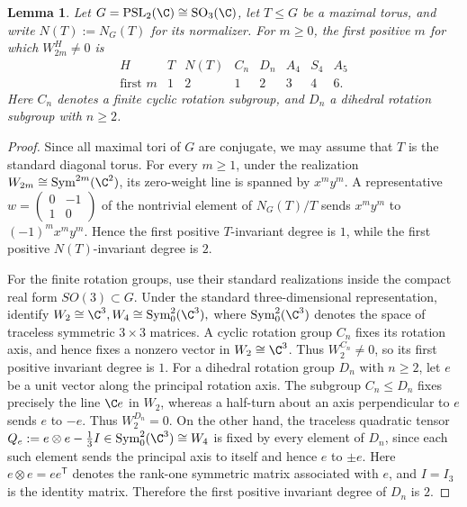 \documentclass[12pt,leqno]{amsart}
\numberwithin{equation}{section} \newtheorem{thm}{Theorem}[section] \newtheorem{lem}[thm]{Lemma} \newtheorem{ex}[thm]{Example} \newtheorem{prop}[thm]{Proposition} \newtheorem{cor}[thm]{Corollary} \newtheorem{defi}[thm]{Definition} \newtheorem{rmk}[thm]{Remark} \newtheorem{notation}[thm]{Notation}
\newcommand{\Sym}{\operatorname{Sym}}
\newcommand{\SO}{\operatorname{SO}}
\newcommand{\PSLtwo}{\operatorname{PSL}_2(\C)}
\begin{document}
\begin{lem}\label{lem:first-invariant-degrees}
Let $G=\PSLtwo\cong\SO_3(\C)$, let $T\le G$ be a maximal torus, and write \(N(T):=N_G(T)\) for its normalizer. For $m\ge0$, the first positive $m$ for which $W_{2m}^H\ne0$ is
\[
\begin{array}{c|ccccccc}
H&T&N(T)&C_n&D_n&A_4&S_4&A_5\\ \hline
\text{first }m&1&2&1&2&3&4&6.
\end{array}
\]
Here $C_n$ denotes a finite cyclic rotation subgroup, and $D_n$ a dihedral rotation subgroup with $n\ge2$.
\end{lem}

\begin{proof}
Since all maximal tori of $G$ are conjugate, we may assume that $T$ is the standard diagonal torus. For every $m\ge1$, under the realization $W_{2m}\cong\Sym^{2m}(\C^2)$, its zero-weight line is spanned by $x^my^m$. A representative $w=\begin{pmatrix}0&-1\\1&0\end{pmatrix}$ of the nontrivial element of $N_G(T)/T$ sends $x^my^m$ to $(-1)^m x^my^m$. Hence the first positive $T$-invariant degree is $1$, while the first positive $N(T)$-invariant degree is $2$.

For the finite rotation groups, use their standard realizations inside the compact real form \(SO(3)\subset G\). Under the standard three-dimensional representation, identify \(W_2\cong\C^3,W_4\cong\Sym^2_0(\C^3),\) where \(\Sym^2_0(\C^3)\) denotes the space of traceless symmetric \(3\times3\) matrices. A cyclic rotation group \(C_n\) fixes its rotation axis, and hence fixes a nonzero vector in \(W_2\cong\C^3\). Thus \(W_2^{C_n}\ne0\), so its first positive invariant degree is \(1\). For a dihedral rotation group $D_n$ with $n\ge2$, let $e$ be a unit vector along the principal rotation axis. The subgroup $C_n\le D_n$ fixes precisely the line $\C e$ in $W_2$, whereas a half-turn about an axis perpendicular to $e$ sends $e$ to $-e$. Thus $W_2^{D_n}=0$. On the other hand, the traceless quadratic tensor \(Q_e:=e\otimes e-\frac13 I\in\Sym^2_0(\C^3)\cong W_4\) is fixed by every element of $D_n$, since each such element sends the principal axis to itself and hence $e$ to $\pm e$. Here \(e\otimes e=ee^{\mathsf T}\) denotes the rank-one symmetric matrix associated with \(e\), and \(I=I_3\) is the identity matrix. Therefore the first positive invariant degree of $D_n$ is $2$.


\end{proof}
\end{document}
